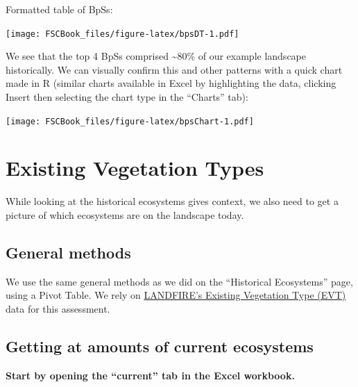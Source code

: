 \documentclass[
]{book}
\begin{document}
Formatted table of BpSs:

\texttt{[image: FSCBook\_files/figure-latex/bpsDT-1.pdf]}

We see that the top 4 BpSs comprised \textasciitilde80\% of our example landscape historically. We can visually confirm this and other patterns with a quick chart made in R (similar charts available in Excel by highlighting the data, clicking Insert then selecting the chart type in the ``Charts'' tab):

\texttt{[image: FSCBook\_files/figure-latex/bpsChart-1.pdf]}

\hypertarget{evt}{%
\chapter{Existing Vegetation Types}\label{evt}}

While looking at the historical ecosystems gives context, we also need to get a picture of which ecosystems are on the landscape today.

\hypertarget{general-methods-1}{%
\section{General methods}\label{general-methods-1}}

We use the same general methods as we did on the ``Historical Ecosystems'' page, using a Pivot Table. We rely on \href{https://www.landfire.gov/evt.php}{LANDFIRE's Existing Vegetation Type (EVT)} data for this assessment.

\hypertarget{getting-at-amounts-of-current-ecosystems}{%
\section{Getting at amounts of current ecosystems}\label{getting-at-amounts-of-current-ecosystems}}

\textbf{Start by opening the ``current'' tab in the Excel workbook.}
\end{document}
